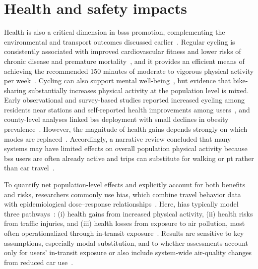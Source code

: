 \section{Health and safety impacts}
\label{sec:health_and_safety_impacts}

Health is also a critical dimension in \acp{bss} promotion, complementing the environmental and transport outcomes discussed earlier~\cite{DeMaio2009, Fishman2016, Qiu2018}. Regular cycling is consistently associated with improved cardiovascular fitness and lower risks of chronic disease and premature mortality~\cite{Green2021, Celis-Morales2017, Dutheil2020}, and it provides an efficient means of achieving the recommended 150 minutes of moderate to vigorous physical activity per week~\cite{Knowler2002}. Cycling can also support mental well-being~\cite{Chekroud2018, Ruiz2015}, but evidence that bike-sharing substantially increases physical activity at the population level is mixed. Early observational and survey-based studies reported increased cycling among residents near stations and self-reported health improvements among users~\cite{Fuller2013, Molina-Garcia2013, Alberts2012}, and county-level analyses linked \ac{bss} deployment with small declines in obesity prevalence~\cite{Xu2019, Hosford2019}. However, the magnitude of health gains depends strongly on which modes are replaced~\cite{Fishman2014, Murphy2015}. Accordingly, a narrative review concluded that many systems may have limited effects on overall population physical activity because \ac{bss} users are often already active and trips can substitute for walking or \ac{pt} rather than car travel~\cite{Bauman2017}.

To quantify net population-level effects and explicitly account for both benefits and risks, researchers commonly use \acp{hia}, which combine travel behavior data with epidemiological dose--response relationships~\cite{Rojas-Rueda2011, Woodcock2014, Otero2018, Clockston2021}. Here, \acp{hia} typically model three pathways~\cite{Teixeira2021}: (i) health gains from increased physical activity, (ii) health risks from traffic injuries, and (iii) health losses from exposure to air pollution, most often operationalized through in-transit  exposure~\cite{Woodcock2014, Otero2018, Clockston2021, Cao2021}. Results are sensitive to key assumptions, especially modal substitution, and to whether assessments account only for users' in-transit exposure or also include system-wide air-quality changes from reduced car use~\cite{Clockston2021, Hou2023}.

